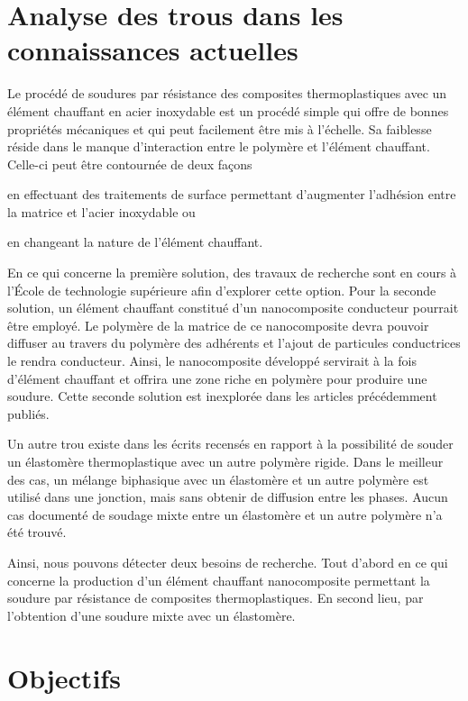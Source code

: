 \label{sec:Objectifs}

\section{Analyse des trous dans les connaissances actuelles}

Le procédé de soudures par résistance des composites thermoplastiques avec un élément chauffant en acier inoxydable est un procédé simple qui offre de bonnes propriétés mécaniques et qui peut facilement être mis à l'échelle. 
Sa faiblesse réside dans le manque d'interaction entre le polymère et l'élément chauffant. 
Celle-ci peut être contournée de deux façons \begin{inparaenum}[a)]
	\item en effectuant des traitements de surface permettant d'augmenter l'adhésion entre la matrice et l'acier inoxydable ou 
	\item en changeant la nature de l'élément chauffant. 
\end{inparaenum}
En ce qui concerne la première solution, des travaux de recherche sont en cours à l'École de technologie supérieure afin d'explorer cette option. 
Pour la seconde solution, un élément chauffant constitué d'un nanocomposite conducteur pourrait être employé. 
Le polymère de la matrice de ce nanocomposite devra pouvoir diffuser au travers du polymère des adhérents et l'ajout de particules conductrices le rendra conducteur. 
Ainsi, le nanocomposite développé servirait à la fois d'élément chauffant et offrira une zone riche en polymère pour produire une soudure. 
Cette seconde solution est inexplorée dans les articles précédemment publiés. 

Un autre trou existe dans les écrits recensés en rapport à la possibilité de souder un élastomère thermoplastique avec un autre polymère rigide. 
Dans le meilleur des cas, un mélange biphasique avec un élastomère et un autre polymère est utilisé dans une jonction, mais sans obtenir de diffusion entre les phases. 
Aucun cas documenté de soudage mixte entre un élastomère et un autre polymère n'a été trouvé. 

Ainsi, nous pouvons détecter deux besoins de recherche. 
Tout d'abord en ce qui concerne la production d'un élément chauffant nanocomposite permettant la soudure par résistance de composites thermoplastiques. 
En second lieu, par l'obtention d'une soudure mixte avec un élastomère. 

\section{Objectifs}

